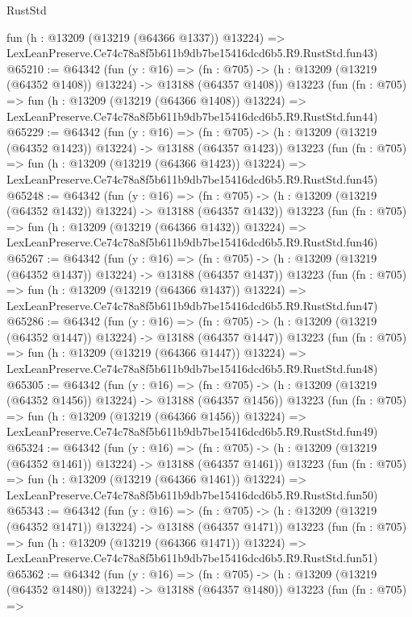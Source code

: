 \begin{lexlean}{RustStd}
\begin{coremodule}
    fun (h : @13209 (@13219 (@64366 @1337)) @13224) =>
    LexLeanPreserve.Ce74c78a8f5b611b9db7be15416dcd6b5.R9.RustStd.fun43)
@65210 := @64342
    (fun (y : @16) =>
    (fn : @705) -> (h : @13209 (@13219 (@64352 @1408)) @13224) -> @13188 (@64357 @1408))
    @13223
    (fun (fn : @705) =>
    fun (h : @13209 (@13219 (@64366 @1408)) @13224) =>
    LexLeanPreserve.Ce74c78a8f5b611b9db7be15416dcd6b5.R9.RustStd.fun44)
@65229 := @64342
    (fun (y : @16) =>
    (fn : @705) -> (h : @13209 (@13219 (@64352 @1423)) @13224) -> @13188 (@64357 @1423))
    @13223
    (fun (fn : @705) =>
    fun (h : @13209 (@13219 (@64366 @1423)) @13224) =>
    LexLeanPreserve.Ce74c78a8f5b611b9db7be15416dcd6b5.R9.RustStd.fun45)
@65248 := @64342
    (fun (y : @16) =>
    (fn : @705) -> (h : @13209 (@13219 (@64352 @1432)) @13224) -> @13188 (@64357 @1432))
    @13223
    (fun (fn : @705) =>
    fun (h : @13209 (@13219 (@64366 @1432)) @13224) =>
    LexLeanPreserve.Ce74c78a8f5b611b9db7be15416dcd6b5.R9.RustStd.fun46)
@65267 := @64342
    (fun (y : @16) =>
    (fn : @705) -> (h : @13209 (@13219 (@64352 @1437)) @13224) -> @13188 (@64357 @1437))
    @13223
    (fun (fn : @705) =>
    fun (h : @13209 (@13219 (@64366 @1437)) @13224) =>
    LexLeanPreserve.Ce74c78a8f5b611b9db7be15416dcd6b5.R9.RustStd.fun47)
@65286 := @64342
    (fun (y : @16) =>
    (fn : @705) -> (h : @13209 (@13219 (@64352 @1447)) @13224) -> @13188 (@64357 @1447))
    @13223
    (fun (fn : @705) =>
    fun (h : @13209 (@13219 (@64366 @1447)) @13224) =>
    LexLeanPreserve.Ce74c78a8f5b611b9db7be15416dcd6b5.R9.RustStd.fun48)
@65305 := @64342
    (fun (y : @16) =>
    (fn : @705) -> (h : @13209 (@13219 (@64352 @1456)) @13224) -> @13188 (@64357 @1456))
    @13223
    (fun (fn : @705) =>
    fun (h : @13209 (@13219 (@64366 @1456)) @13224) =>
    LexLeanPreserve.Ce74c78a8f5b611b9db7be15416dcd6b5.R9.RustStd.fun49)
@65324 := @64342
    (fun (y : @16) =>
    (fn : @705) -> (h : @13209 (@13219 (@64352 @1461)) @13224) -> @13188 (@64357 @1461))
    @13223
    (fun (fn : @705) =>
    fun (h : @13209 (@13219 (@64366 @1461)) @13224) =>
    LexLeanPreserve.Ce74c78a8f5b611b9db7be15416dcd6b5.R9.RustStd.fun50)
@65343 := @64342
    (fun (y : @16) =>
    (fn : @705) -> (h : @13209 (@13219 (@64352 @1471)) @13224) -> @13188 (@64357 @1471))
    @13223
    (fun (fn : @705) =>
    fun (h : @13209 (@13219 (@64366 @1471)) @13224) =>
    LexLeanPreserve.Ce74c78a8f5b611b9db7be15416dcd6b5.R9.RustStd.fun51)
@65362 := @64342
    (fun (y : @16) =>
    (fn : @705) -> (h : @13209 (@13219 (@64352 @1480)) @13224) -> @13188 (@64357 @1480))
    @13223
    (fun (fn : @705) =>

\end{coremodule}
\end{lexlean}
